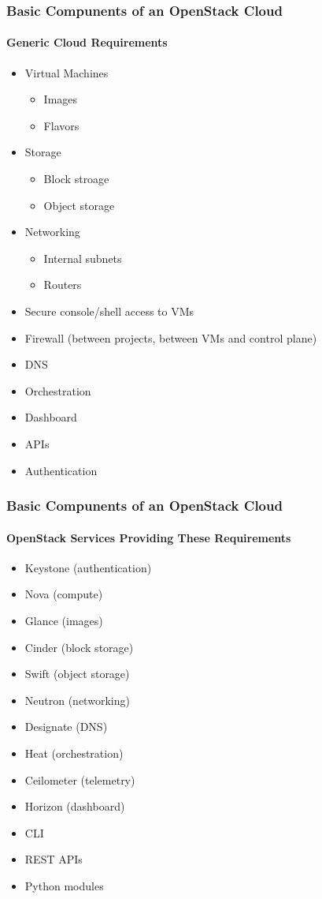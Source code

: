\documentclass[helvetica,english,utf8,notitle,nologo]{beamer}
\begin{document}
\begin{frame}
  \frametitle{Basic Compunents of an OpenStack Cloud}
  \framesubtitle{Generic Cloud Requirements}
  \begin{itemize}
  \item Virtual Machines
    \begin{itemize}
    \item Images
    \item Flavors
    \end{itemize}
  \item Storage
    \begin{itemize}
    \item Block stroage
    \item Object storage
    \end{itemize}
  \item Networking
    \begin{itemize}
    \item Internal subnets
    \item Routers
    \end{itemize}
  \item Secure console/shell access to VMs
  \item Firewall (between projects, between VMs and control plane)
  \item DNS
  \item Orchestration
  \item Dashboard
  \item APIs
  \item Authentication
  \end{itemize}
\end{frame}

\begin{frame}
  \frametitle{Basic Compunents of an OpenStack Cloud}
  \framesubtitle{OpenStack Services Providing These Requirements}
  \begin{itemize}
    \item Keystone (authentication)
    \item Nova (compute)
    \item Glance (images)
    \item Cinder (block storage)
    \item Swift (object storage)
    \item Neutron (networking)
    \item Designate (DNS)
    \item Heat (orchestration)
    \item Ceilometer (telemetry)
    \item Horizon (dashboard)
    \item CLI
    \item REST APIs
    \item Python modules
  \end{itemize}
\end{frame}
\end{document}
